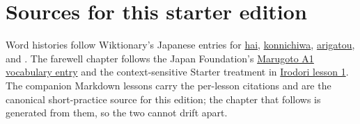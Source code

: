 
\backmatter





\chapter*{Sources for this starter edition}

Word histories follow Wiktionary's Japanese entries for
\href{https://en.wiktionary.org/wiki/\%E3\%81\%AF\%E3\%81\%84}{hai},
\href{https://en.wiktionary.org/wiki/\%E4\%BB\%8A\%E6\%97\%A5\%E3\%81\%AF}{konnichiwa},
\href{https://en.wiktionary.org/wiki/\%E6\%9C\%89\%E9\%9B\%A3\%E3\%81\%86}{arigatou},
and
\href{https://en.wiktionary.org/wiki/\%E3\%82\%B3\%E3\%83\%BC\%E3\%83\%92\%E3\%83\%BC}{}.
The farewell chapter follows the Japan Foundation's
\href{https://words.marugotoweb.jp/search_detail.php?cd=1\&id=435\&lang=en\&lv=A1\&source=cando}{Marugoto A1 vocabulary entry}
and the context-sensitive Starter treatment in
\href{https://www.irodori.jpf.go.jp/assets/data/starter/pdf/X_L01_au.pdf}{Irodori lesson 1}.
The companion Markdown lessons carry the per-lesson citations and are the
canonical short-practice source for this edition; the chapter that follows is
generated from them, so the two cannot drift apart.




